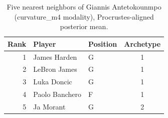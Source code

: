 \begin{table}[htbp]
  \centering\small
  \begin{tabular}{rllc}
    \toprule
    Rank & Player & Position & Archetype \\
    \midrule
    1 & James Harden & G & 1 \\
    2 & LeBron James & G & 1 \\
    3 & Luka Doncic & G & 1 \\
    4 & Paolo Banchero & F & 1 \\
    5 & Ja Morant & G & 2 \\
    \bottomrule
  \end{tabular}
  \caption{Five nearest neighbors of Giannis Antetokounmpo (curvature_m4 modality), Procrustes-aligned posterior mean.}
  \label{tab:Giannis_Antetokounmpo_neighbors_curvature_m4}
\end{table}

